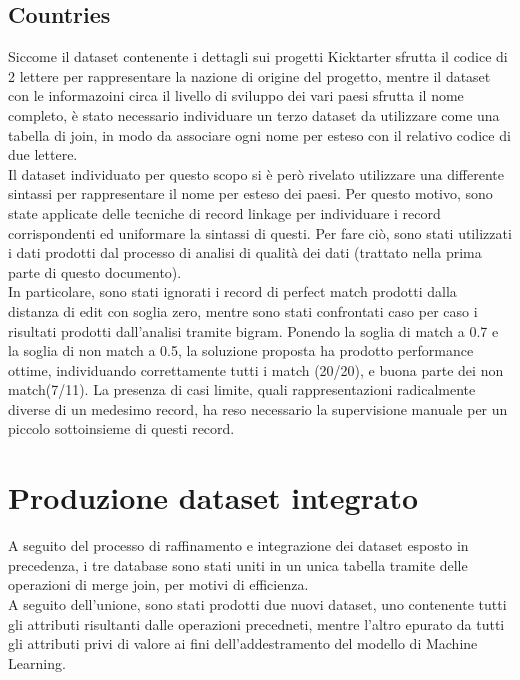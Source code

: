 \subsection{Countries}
Siccome il dataset contenente i dettagli sui progetti Kicktarter sfrutta il codice di 2 lettere per rappresentare la nazione di origine del progetto, mentre il dataset con le informazoini circa il livello di sviluppo dei vari paesi sfrutta il nome completo, è stato necessario individuare un terzo dataset da utilizzare come una tabella di join, in modo da associare ogni nome per esteso con il relativo codice di due lettere.\\
Il dataset individuato per questo scopo si è però rivelato utilizzare una differente sintassi per rappresentare il nome per esteso dei paesi. Per questo motivo, sono state applicate delle tecniche di record linkage per individuare i record corrispondenti ed uniformare la sintassi di questi. Per fare ciò, sono stati utilizzati i dati prodotti dal processo di analisi di qualità dei dati (trattato nella prima parte di questo documento).\\
In particolare, sono stati ignorati i record di perfect match prodotti dalla distanza di edit con soglia zero, mentre sono stati confrontati caso per caso i risultati prodotti dall'analisi tramite bigram. Ponendo la soglia di match a 0.7 e la soglia di non match a 0.5, la soluzione proposta ha prodotto performance ottime, individuando correttamente tutti i match (20/20), e buona parte dei non match(7/11). La presenza di casi limite, quali rappresentazioni radicalmente diverse di un medesimo record, ha reso necessario la supervisione manuale per un piccolo sottoinsieme di questi record.\\

\section{Produzione dataset integrato}
A seguito del processo di raffinamento e integrazione dei dataset esposto in precedenza, i tre database sono stati uniti in un unica tabella tramite delle operazioni di merge join, per motivi di efficienza.\\
A seguito dell'unione, sono stati prodotti due nuovi dataset, uno contenente tutti gli attributi risultanti dalle operazioni precedneti, mentre l'altro epurato da tutti gli attributi privi di valore ai fini dell'addestramento del modello di Machine Learning.
